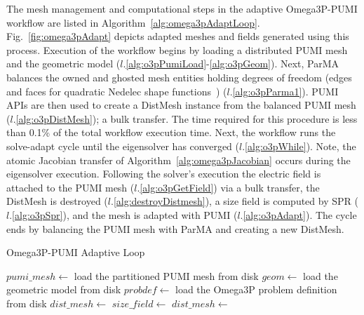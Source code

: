 The mesh management and computational steps in the adaptive Omega3P-PUMI
workflow are listed in Algorithm~\ref{alg:omega3pAdaptLoop}.
Fig.~\ref{fig:omega3pAdapt} depicts adapted meshes and fields generated using
this process.
Execution of the workflow begins by loading a distributed PUMI mesh
and the geometric model ($l.$\ref{alg:o3pPumiLoad}-\ref{alg:o3pGeom}).
Next, ParMA balances the owned and ghosted mesh
entities holding degrees of freedom (edges and faces for quadratic Nedelec shape
functions~\cite{ingelstrom2006new}) ($l.$\ref{alg:o3pParma1}).
PUMI APIs are then used to create a DistMesh instance from the balanced PUMI
mesh ($l.$\ref{alg:o3pDistMesh}); a bulk transfer.
The time required for this procedure is less than 0.1\% of the total workflow
execution time.
Next, the workflow runs the solve-adapt cycle until the eigensolver has
converged ($l.$\ref{alg:o3pWhile}).
Note, the atomic Jacobian transfer of Algorithm~\ref{alg:omega3pJacobian} occurs
during the eigensolver execution.
Following the solver's execution the electric field is attached to the PUMI
mesh ($l.$\ref{alg:o3pGetField}) via a bulk transfer, the DistMesh is destroyed
($l.$\ref{alg:destroyDistmesh}),
a size field is computed by SPR ($l.$\ref{alg:o3pSpr}), and the mesh is adapted
with PUMI ($l.$\ref{alg:o3pAdapt}).
The cycle ends by balancing the PUMI mesh with ParMA and creating a new
DistMesh.

\begin{algorithm}
  \caption{Omega3P-PUMI Adaptive Loop}\label{alg:omega3pAdaptLoop}
  \begin{algorithmic}[1]
      \State $pumi\_mesh \gets$ load the partitioned PUMI mesh from disk\label{alg:o3pPumiLoad}
      \State $geom \gets$ load the geometric model from disk\label{alg:o3pGeom}
      \State $probdef \gets$ load the Omega3P problem definition from disk
      \State {}
        \label{alg:o3pParma1}
      \State $dist\_mesh \gets$ 
         \label{alg:o3pDistMesh} 
           \label{alg:o3pWhile} 
        \State {}
          \label{alg:o3pGetField}
        \State {}\label{alg:destroyDistmesh}
        \State $size\_field \gets$ \label{alg:o3pSpr}
        \State {}\label{alg:o3pAdapt}
        \State {}
        \State $dist\_mesh \gets$  
      \EndWhile
    \EndProcedure
  \end{algorithmic}
\end{algorithm}


